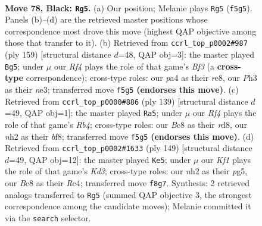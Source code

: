 \documentclass[11pt]{article}
\begin{document}
\clearpage

\begin{figure}[p]\centering
\begin{subfigure}{0.46\textwidth}\centering
\resizebox{\linewidth}{!}{%
\newchessgame
\chessboard[
  setfen={1Bb2k2/8/8/5r2/PP2B3/2K4p/1R5N/8 b - - 14 78},
  showmover=false,
  pgfstyle=straightmove, color=movearrow, markmove={f5-g5}
]}
\caption{}
\end{subfigure}\hfill
\begin{subfigure}{0.46\textwidth}\centering
\resizebox{\linewidth}{!}{%
\newchessgame
\chessboard[
  setfen={4R3/3P2k1/2B2b2/8/8/4N2p/3r4/7K b - - 4 80},
  showmover=false,
  pgfstyle=straightmove, color=movearrow, markmove={f6-g5}
]}
\caption{}
\end{subfigure}
\\[4pt]
\begin{subfigure}{0.46\textwidth}\centering
\resizebox{\linewidth}{!}{%
\newchessgame
\chessboard[
  setfen={3R1B2/7p/2bPk2P/1r6/8/8/2P5/2K5 b - - 46 70},
  showmover=false,
  pgfstyle=straightmove, color=movearrow, markmove={b5-a5}
]}
\caption{}
\end{subfigure}\hfill
\begin{subfigure}{0.46\textwidth}\centering
\resizebox{\linewidth}{!}{%
\newchessgame
\chessboard[
  setfen={8/8/3k2p1/6P1/2r5/4KP2/1Rb1N3/8 b - - 20 75},
  showmover=false,
  pgfstyle=straightmove, color=movearrow, markmove={d6-e5}
]}
\caption{}
\end{subfigure}
\caption{\textbf{Move 78, Black: \texttt{Rg5}.} (a) Our position; Melanie plays \texttt{Rg5} (\texttt{f5g5}). Panels (b)--(d) are the retrieved master positions whose correspondence most drove this move (highest QAP objective among those that transfer to it). (b) Retrieved from \texttt{ccrl\_top\_p0002\#987} (ply 159) [structural distance $d$=48, QAP obj=3]: the master played \texttt{Bg5}; under $\mu$ our \emph{Rf4} plays the role of that game's \emph{Bf3} (a \textbf{cross-type} correspondence); cross-type roles: our \emph{p}a4 as their \emph{r}e8, our \emph{P}h3 as their \emph{n}e3; transferred move \texttt{f5g5} \textbf{(endorses this move)}. (c) Retrieved from \texttt{ccrl\_top\_p0000\#886} (ply 139) [structural distance $d$=49, QAP obj=1]: the master played \texttt{Ra5}; under $\mu$ our \emph{Rf4} plays the role of that game's \emph{Rb4}; cross-type roles: our \emph{B}c8 as their \emph{r}d8, our \emph{n}h2 as their \emph{b}f8; transferred move \texttt{f5g5} \textbf{(endorses this move)}. (d) Retrieved from \texttt{ccrl\_top\_p0002\#1633} (ply 149) [structural distance $d$=49, QAP obj=12]: the master played \texttt{Ke5}; under $\mu$ our \emph{Kf1} plays the role of that game's \emph{Kd3}; cross-type roles: our \emph{n}h2 as their \emph{p}g5, our \emph{B}c8 as their \emph{R}c4; transferred move \texttt{f8g7}. Synthesis: 2 retrieved analogs transferred to \texttt{Rg5} (summed QAP objective 3, the strongest correspondence among the candidate moves); Melanie committed it via the \texttt{search} selector.}
\label{fig:thought-m155}
\end{figure}
\end{document}

